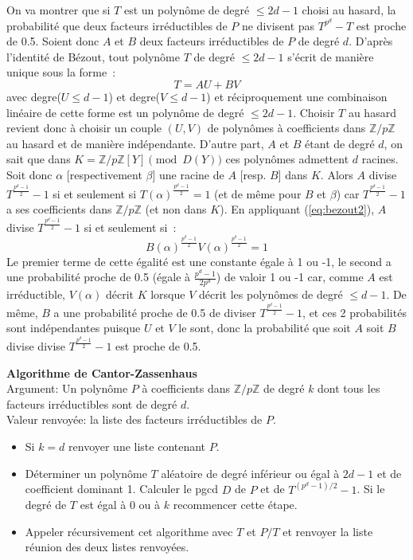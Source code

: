\documentclass[a4paper,11pt]{article}
\newcommand{\Z}{{\mathbb{Z}}}
\begin{document}
\begin{giacjshere}
On va montrer que si $T$ est un polynôme de degré $\leq 2d-1$ choisi au hasard,
la probabilité que deux facteurs irréductibles de $P$ ne divisent pas 
$T^{p^d}-T$ est proche de 0.5. Soient donc $A$ et $B$ deux facteurs
irréductibles de $P$ de degré $d$. D'après l'identité de Bézout, tout 
polynôme $T$ de degré $\leq 2d-1$ s'écrit de manière unique sous la forme~:
\begin{equation} \label{eq:bezout2} 
T = A U + B V 
\end{equation}
avec degre($U \leq d-1$) et degre($V \leq d-1$) et réciproquement 
une combinaison linéaire de cette forme est un polynôme de degré $\leq 2d-1$.
Choisir $T$ au hasard revient donc à choisir un couple $(U,V)$ de polynômes
à coefficients dans $\Z/p\Z$ au hasard et
de manière indépendante. D'autre part, $A$ et $B$ étant de degré $d$, on
sait que dans $K=\Z/p\Z[Y] \pmod{D(Y)}$ ces polynômes admettent $d$ racines.
Soit donc $\alpha$ [respectivement $\beta$] une racine de $A$ [resp. $B$]
dans $K$. Alors $A$ divise $T^{\frac{p^d-1}{2}}-1$
si et seulement si $T(\alpha )^{\frac{p^d-1}{2}}=1$ (et de même pour
$B$ et $\beta$) car $T^{\frac{p^d-1}{2}}-1$ a ses coefficients dans
$\Z/p\Z$ (et non dans $K$). 
En appliquant (\ref{eq:bezout2}), $A$ divise $T^{\frac{p^d-1}{2}}-1$
si et seulement si~:
\[ B(\alpha )^{\frac{p^d-1}{2}}V(\alpha )^{\frac{p^d-1}{2}}=1 \]
Le premier terme de cette égalité est une constante égale à 1 ou -1, 
le second a une probabilité proche de 0.5 (égale à $\frac{p^d-1}{2p^d}$)
de valoir 1 ou -1 car, comme $A$ est irréductible,
$V(\alpha)$ décrit $K$ lorsque $V$ décrit les 
polynômes de degré $\leq d-1$.
De même, $B$ a une probabilité proche de 0.5 de diviser 
$T^{\frac{p^d-1}{2}}-1$, et ces 2 probabilités sont indépendantes
puisque $U$ et $V$ le sont, donc la probabilité que soit $A$ soit $B$ divise
divise $T^{\frac{p^d-1}{2}}-1$ est proche de 0.5.

{\bf Algorithme de Cantor-Zassenhaus}\\
Argument: Un polynôme $P$ à coefficients dans $\Z/p\Z$ de degré $k$
dont tous les facteurs irréductibles sont de degré $d$.\\
Valeur renvoyée: la liste des facteurs irréductibles de $P$.\\
\begin{itemize}
\item Si $k=d$ renvoyer une liste contenant $P$.
\item Déterminer un polynôme $T$ aléatoire de degré inférieur ou égal
à $2d-1$ et de coefficient dominant 1. Calculer le pgcd $D$ de $P$
et de $T^{(p^d-1)/2}-1$. Si le degré de $T$ est égal à 0 ou à $k$ 
recommencer cette étape.
\item Appeler récursivement cet algorithme avec $T$ et $P/T$ et
renvoyer la liste réunion des deux listes renvoyées.
\end{itemize}


\end{giacjshere}
\end{document}
